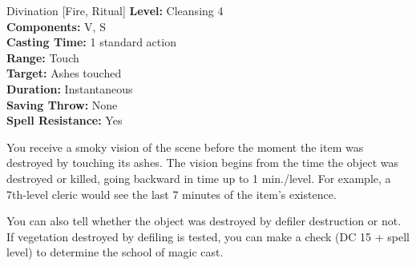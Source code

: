 {Divination [Fire, Ritual]}
{
	\textbf{Level:}
	Cleansing 4\\
	\textbf{Components:}
	V, S\\
	\textbf{Casting Time:}
	1 standard action\\
	\textbf{Range:}
	Touch\\
	\textbf{Target:}
	Ashes touched\\
	\textbf{Duration:}
	Instantaneous\\
	\textbf{Saving Throw:}
	None\\
	\textbf{Spell Resistance:}
	Yes\\
}
{
	You receive a smoky vision of the scene before the moment the item was destroyed by touching its ashes. The vision begins from the time the object was destroyed or killed, going backward in time up to 1 min./level. For example, a 7th-level cleric would see the last 7 minutes of the item's existence.

	You can also tell whether the object was destroyed by defiler destruction or not. If vegetation destroyed by defiling is tested, you can make a  check (DC 15 + spell level) to determine the school of magic cast.
}
